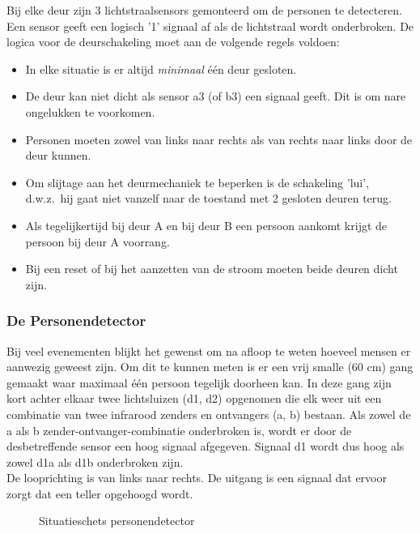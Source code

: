 Bij elke deur zijn 3 lichtstraalsensors gemonteerd om de personen te
detecteren. Een sensor geeft een logisch '1' signaal af als de lichtstraal wordt 
onderbroken. 
De logica voor de deurschakeling moet aan de volgende regels voldoen:
\begin{itemize}
\item
In elke situatie is er altijd {\em minimaal} \'e\'en deur gesloten.
\item
De deur kan niet dicht als sensor a3 (of b3) een signaal geeft. Dit
is om nare ongelukken te voorkomen.
\item
Personen moeten zowel van links naar rechts als van rechts naar links
door de deur kunnen. 
\item
Om slijtage aan het deurmechaniek te beperken is de schakeling 'lui',
d.w.z.\ hij gaat niet vanzelf naar de toestand met 2 gesloten deuren terug.
\item
Als tegelijkertijd bij deur A en bij deur B een persoon
aankomt krijgt de persoon bij deur A voorrang.
\item
Bij een reset of bij het aanzetten van de stroom moeten beide 
deuren dicht zijn.
\end{itemize}

\clearpage

\subsubsection{De Personendetector}

Bij veel evenementen blijkt het gewenst om na afloop te weten hoeveel mensen er aanwezig geweest zijn. Om dit te kunnen meten is er een vrij smalle (60 cm) gang gemaakt waar maximaal \'e\'en persoon tegelijk doorheen kan. In deze gang zijn kort achter elkaar twee lichtsluizen (d1, d2) opgenomen die elk weer uit een combinatie van twee infrarood zenders en ontvangers (a, b) bestaan. Als zowel de a als b zender-ontvanger-combinatie onderbroken is, wordt er door de desbetreffende sensor een hoog signaal afgegeven. Signaal d1 wordt dus hoog als zowel d1a als d1b onderbroken zijn.\\
De looprichting is van links naar rechts. De uitgang is een signaal dat ervoor zorgt dat een teller opgehoogd wordt.

\begin{figure}[bth]
\centerline{}
\caption{Situatieschets personendetector}
\label{persdetect}
\end{figure}

